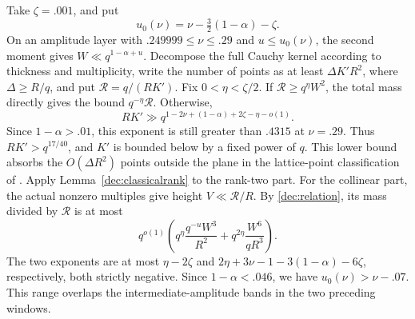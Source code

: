 \documentclass[11pt,a4paper]{article}
\theoremstyle{paperplain}
\numberwithin{equation}{section}
\begin{document}
Take $\zeta=.001$, and put
\[
 u_0(\nu)=\nu-\tfrac32(1-\alpha)-\zeta.
\]
On an amplitude layer with $.249999\le\nu\le.29$ and
$u\le u_0(\nu)$, the second moment gives $W\ll q^{1-\alpha+u}$.
Decompose the full Cauchy kernel according to thickness and multiplicity,
write the number of points as at least $\Delta K'R^2$, where
$\Delta\ge R/q$, and put $\mathcal R=q/(RK')$.
Fix $0<\eta<\zeta/2$. If $\mathcal R\ge q^\eta W^2$, the total
mass directly gives the bound $q^{-\eta}\mathcal R$.
Otherwise,
\begin{equation}\label{dec:largeamplitudeNK}
 RK'\gg q^{1-2\nu+(1-\alpha)+2\zeta-\eta-o(1)}.
\end{equation}
Since $1-\alpha>.01$, this exponent is still greater than $.4315$
at $\nu=.29$. Thus $RK'>q^{17/40}$, and $K'$ is bounded below
by a fixed power of $q$. This lower bound absorbs the
$O(\Delta R^2)$ points outside the plane in the lattice-point
classification of \cite[Lemma 13.2]{Maynard2019}.
Apply Lemma~\ref{dec:classicalrank} to the rank-two part.
For the collinear part, the actual nonzero multiples give height
$V\ll\mathcal R/R$. By \eqref{dec:relation}, its mass divided by
$\mathcal R$ is at most
\[
 q^{o(1)}\left(q^\eta\frac{q^{-u}W^3}{R^2}
          +q^{2\eta}\frac{W^6}{qR^3}\right).
\]
The two exponents are at most $\eta-2\zeta$ and
$2\eta+3\nu-1-3(1-\alpha)-6\zeta$, respectively, both strictly negative.
Since $1-\alpha<.046$, we have $u_0(\nu)>\nu-.07$.
This range overlaps the intermediate-amplitude bands in the two
preceding windows.
\end{document}
